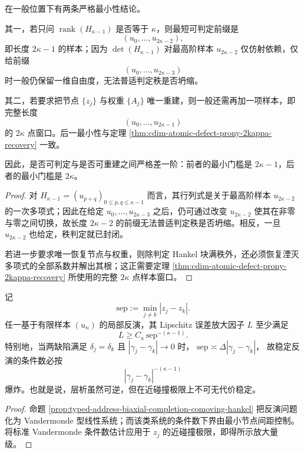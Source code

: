 \begin{theorem}\label{thm:typed-address-biaxial-completion-comoving-prony-threshold}
在一般位置下有两条严格最小性结论。

其一，若只问 \(\operatorname{rank}(H_{\kappa-1})\) 是否等于 \(\kappa\)，则最短可判定前缀是
\[
(u_0,\dots,u_{2\kappa-2}),
\]
即长度 \(2\kappa-1\) 的样本；因为 \(\det(H_{\kappa-1})\) 对最高阶样本 \(u_{2\kappa-2}\) 仅仿射依赖，仅给前缀
\[
(u_0,\dots,u_{2\kappa-3})
\]
时一般仍保留一维自由度，无法普适判定秩是否坍缩。

其二，若要求把节点 \(\{z_j\}\) 与权重 \(\{A_j\}\) 唯一重建，则一般还需再加一项样本，即完整长度
\[
(u_0,\dots,u_{2\kappa-1})
\]
的 \(2\kappa\) 点窗口。后一最小性与定理 \ref{thm:cdim-atomic-defect-prony-2kappa-recovery} 一致。

因此，是否可判定与是否可重建之间严格差一阶：前者的最小门槛是 \(2\kappa-1\)，后者的最小门槛是 \(2\kappa\)。
\end{theorem}
\begin{proof}
对 \(H_{\kappa-1}=(u_{p+q})_{0\le p,q\le \kappa-1}\) 而言，其行列式是关于最高阶样本 \(u_{2\kappa-2}\) 的一次多项式；因此在给定
\(
u_0,\dots,u_{2\kappa-3}
\)
之后，仍可通过改变 \(u_{2\kappa-2}\) 使其在非零与零之间切换，故长度 \(2\kappa-2\) 的前缀无法普适判定秩是否坍缩。相反，一旦 \(u_{2\kappa-2}\) 也给定，秩判定就已封闭。
\par
若进一步要求唯一恢复节点与权重，则除判定 Hankel 块满秩外，还必须恢复湮灭多项式的全部系数并解出其根；这正需要定理 \ref{thm:cdim-atomic-defect-prony-2kappa-recovery} 所使用的完整 \(2\kappa\) 点样本窗口。
\end{proof}

\begin{corollary}[碰撞不适定性]\label{cor:typed-address-biaxial-completion-comoving-collision}
记
\[
\mathrm{sep}:=\min_{j\neq k}|z_j-z_k|.
\]
任一基于有限样本 \((u_n)\) 的局部反演，其 Lipschitz 误差放大因子 \(L\) 至少满足
\[
L\ge C_{\kappa}\,\mathrm{sep}^{-(\kappa-1)}.
\]
特别地，当两缺陷满足 \(\delta_j=\delta_k\) 且 \(|\gamma_j-\gamma_k|\to 0\) 时，
\(
\mathrm{sep}\asymp \Delta |\gamma_j-\gamma_k|
\)，
故稳定反演的条件数必按
\[
|\gamma_j-\gamma_k|^{-(\kappa-1)}
\]
爆炸。也就是说，层析虽然可逆，但在近碰撞极限上不可无代价稳定。
\end{corollary}
\begin{proof}
命题 \ref{prop:typed-address-biaxial-completion-comoving-hankel} 把反演问题化为 Vandermonde 型线性系统；而该类系统的条件数下界由最小节点间距控制。将标准 Vandermonde 条件数估计应用于 \(z_j\) 的近碰撞极限，即得所示放大量级。
\end{proof}

